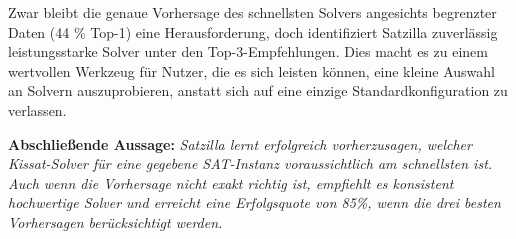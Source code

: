 Zwar bleibt die genaue Vorhersage des schnellsten Solvers angesichts begrenzter Daten (44 \% Top-1) eine 
Herausforderung, doch identifiziert Satzilla zuverlässig leistungsstarke Solver unter den 
Top-3-Empfehlungen. Dies macht es zu einem wertvollen Werkzeug für Nutzer, die es sich leisten 
können, eine kleine Auswahl an Solvern auszuprobieren, anstatt sich auf eine einzige Standardkonfiguration zu verlassen.

\textbf{Abschließende Aussage:} \textit{Satzilla lernt erfolgreich vorherzusagen, welcher Kissat-Solver für eine gegebene SAT-Instanz voraussichtlich am schnellsten ist. Auch wenn die Vorhersage nicht exakt richtig ist, empfiehlt es konsistent hochwertige Solver und erreicht eine Erfolgsquote von 85\%, wenn die drei besten Vorhersagen berücksichtigt werden.}
